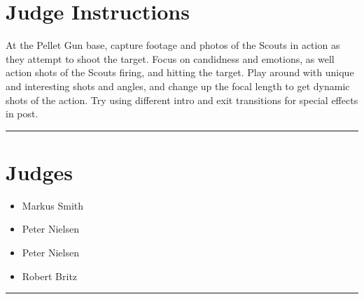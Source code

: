 \documentclass[10pt]{article}
\begin{document}
		\section*{Judge Instructions}
		At the Pellet Gun base, capture footage and photos of the Scouts in action as they attempt to shoot the target. Focus on candidness and emotions, as well action shots of the Scouts firing, and hitting the target. Play around with unique and interesting shots and angles, and change up the focal length to get dynamic shots of the action. Try using different intro and exit transitions for special effects in post.
\vspace{0.5cm}
	\hrule
	\vspace{0.5cm}
		\section*{\faUsers \: Judges}

		

	\begin{multicols}{2}

		\begin{itemize}
									\item Markus Smith
									\item Peter Nielsen
						\end{itemize}

		\vfill\null
		\columnbreak

		\begin{itemize}
									\item Peter Nielsen
									\item Robert Britz
						\end{itemize}

		\vfill\null

		\end{multicols}



			\vspace{0.5cm}
	\hrule
	\vspace{0.5cm}
\end{document}
